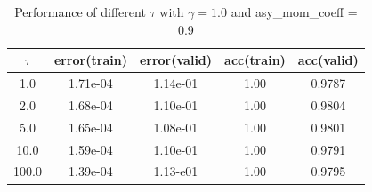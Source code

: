 \documentclass[11pt]{article}
\begin{document}
\begin{table}
\begin{center}
\begin{tabular}{ c c c c c} 
\hline
$\tau$ & error(train) & error(valid) & acc(train) & acc(valid)\\
\hline
\hline
1.0& 1.71e-04 & 1.14e-01 & 1.00 & 0.9787 \\ 
2.0& 1.68e-04 & 1.10e-01 & 1.00 & 0.9804 \\ 
5.0& 1.65e-04 & 1.08e-01 & 1.00 &  0.9801\\ 
10.0& 1.59e-04 & 1.10e-01 & 1.00 & 0.9791 \\
100.0&  1.39e-04 & 1.13-e01 & 1.00 & 0.9795 \\
\end{tabular}
\caption{Performance of different $\tau$ with $\gamma = 1.0$ and asy\_mom\_coeff = 0.9}
\label{tb:tau}
\end{center}	
\end{table}
\end{document}
